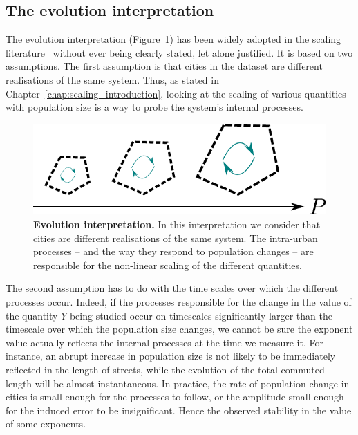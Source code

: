 \subsection{The evolution interpretation}
\label{sub:the_evolution_interpretation}

The evolution interpretation (Figure~\ref{fig:evolution_interpretation}) has
been widely adopted in the scaling literature~\cite{Bettencourt:2007,
Bettencourt:2013,Louf:2014_scaling} without ever being clearly stated, let alone
justified. It is based on two assumptions. The first assumption is that cities in the dataset
are different realisations of the same system. Thus, as stated in
Chapter~\ref{chap:scaling_introduction}, looking at the scaling of various
quantities with population size is a way to probe the system's internal
processes.

\begin{figure}[!h]
    \centering
    \includegraphics[width=\textwidth]{gfx/chapter-scaling/evolution-interpretation.pdf}
    \caption{{\bf Evolution interpretation.} In this interpretation we consider
    that cities are different realisations of the same system. The intra-urban
processes -- and the way they respond to population changes -- are responsible for the non-linear scaling of the different
quantities.\label{fig:evolution_interpretation}}
\end{figure}

The second assumption has to do with the time scales over which the different
processes occur. Indeed, if the processes responsible for the change in the
value of the quantity $Y$ being studied occur on timescales significantly larger
than the timescale over which the population size changes, we cannot be sure the
exponent value actually reflects the internal processes at the time we measure
it.  For instance, an abrupt increase in population size is not likely to be
immediately reflected in the length of streets, while the evolution of the total
commuted length will be almost instantaneous. In practice, the rate of population change in cities is small enough for the
processes to follow, or the amplitude small enough for the induced error to be
insignificant. Hence the observed stability in the value of some exponents.

